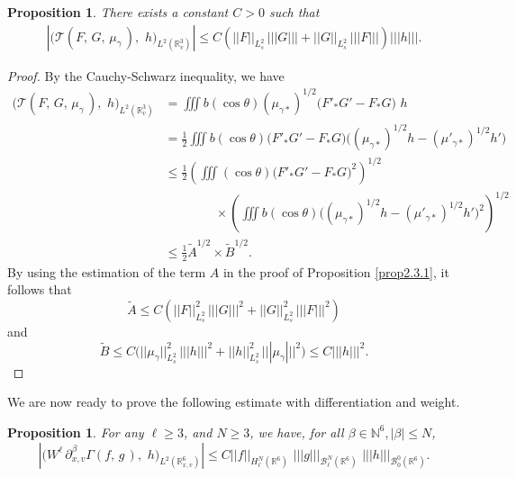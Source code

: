 \documentclass{amsart}[12pt, article]
\newtheorem{prop}[theo]{Proposition}
\begin{document}
\begin{prop}\label{prop3.2.2}
There exists a constant $C>0$ such that
\begin{align}\label{3.2.4}
\left|\Big({{\mathcal T}}(F,\, G,\, \mu_\gamma\,),\,\,
h\Big)_{L^2({{{\mathbb R}}}^3_{v})}\right|\leq C\left( || F||_{L^2_s} \,|||
G|||+ ||
G||_{L^2_s}\,||| F||| \right) ||| h|||.
\end{align}
\end{prop}

\begin{proof} By the Cauchy-Schwarz inequality, we have
\begin{align*}
\Big({{\mathcal T}}(F,\, G,\, \mu_\gamma\,),\,\, h\Big)_{L^2({{{\mathbb R}}}^3_{v})} &=
\iiint b(\cos\theta) (\mu_{\gamma *})^{1/2} \Big( F'_\ast G' -
F_\ast G \Big)\,\,h\\
& =\frac 12 \iiint b(\cos\theta) \Big(F'_\ast G' - F_\ast G\Big)
\Big( (\mu_{\gamma *})^{1/2} h -(\mu'_{\gamma *})^{1/2} h' \Big)\\
&\leq \frac 12 \left(\iiint (\cos\theta) \Big(F'_\ast G'- F_\ast
G\Big)^2 \right)^{1/2}\\
&\qquad\qquad\times \left( \iiint b (\cos\theta) \Big((\mu_{\gamma
*})^{1/2} h - (\mu'_{\gamma *})^{1/2} h' \Big)^2 \right)^{1/2}\\
&\leq \frac 12  \tilde A^{1/2}\times \tilde B^{1/2}.
\end{align*}
By using the estimation of the term ${A}$ in the proof of Proposition
\ref{prop2.3.1}, it follows that
$$
\tilde A\leq C\left( || F||^2_{L^2_s} \,||| G|||^2 + || G||^2_{L^2_s}\,
||| F|||^2 \right)
$$
and
$$
\tilde B\leq C\Big( ||\mu_\gamma||^2_{L^2_s} \,||| h|||^2 + || h||^2_{L^2_s}\,
||| \mu_\gamma|||^2\Big) \leq C ||| h|||^2.
$$
\end{proof}

We are now ready to prove the following estimate with differentiation and weight.

\begin{prop}\label{prop3.2.3}
For any $\ell\geq 3$, and $ N\geq 3$, we have, for all
$\beta\in{{\mathbb N}}^6, |\beta|\leq N$,
\begin{equation*}\label{3.2.5}
\left|\Big(W^\ell \,\partial^\beta_{x, v} \Gamma(f,\, g\,),\,\,
h\Big)_{L^2({{{\mathbb R}}}^6_{x, v})}\right|\leq C ||f||_{H^N_\ell({{{\mathbb R}}}^6)}\,\,
||| g|||_{{{\mathcal B}}^{N}_\ell({{{\mathbb R}}}^6)}\,\, ||| h|||_{{{\mathcal B}}^0_0({{{\mathbb R}}}^6)}.
\end{equation*}
\end{prop}
\end{document}
